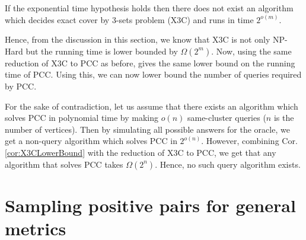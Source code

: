 \begin{corollary}
\label{cor:X3CLowerBound}
If the exponential time hypothesis holds then there does not exist an algorithm which decides exact cover by 3-sets problem (X3C) and runs in time $2^{o(m)}$.
\end{corollary}

Hence, from the discussion in this section, we know that X3C is not only NP-Hard but the running time is lower bounded by $\Omega(2^m)$. Now, using the same reduction of X3C to PCC as before, gives the same lower bound on the running time of PCC. Using this, we can now lower bound the number of queries required by PCC.

For the sake of contradiction, let us assume that there exists an algorithm which solves PCC in polynomial time by making $o(n)$ same-cluster queries ($n$ is the number of vertices). Then by simulating all possible answers for the oracle, we get a non-query algorithm which solves PCC in $2^{o(n)}$. However, combining Cor. \ref{cor:X3CLowerBound} with the reduction of X3C to PCC, we get that any algorithm that solves PCC takes $\Omega(2^n)$. Hence, no such query algorithm exists. 

\section{Sampling positive pairs for general metrics}

